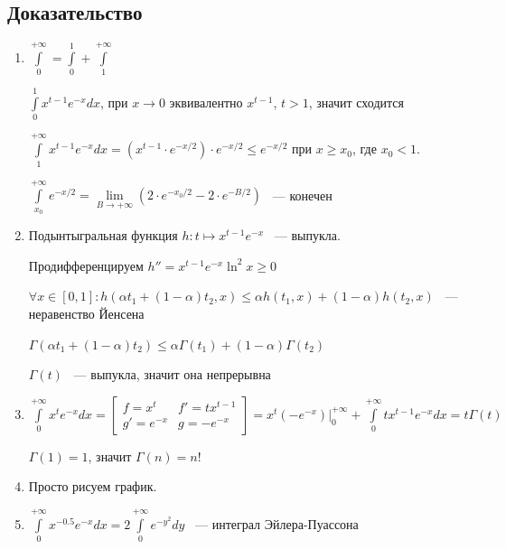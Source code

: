 \documentclass{article}
\begin{document}
        \subsection{Доказательство}
        
            \begin{enumerate}
            
                \item $\int\limits^{+\infty}_0 = \int\limits^1_0 + \int\limits^{+\infty}_1$
                
                    $\int\limits^1_0 x^{t - 1} e^{-x} dx$, при $x \rightarrow 0$ эквивалентно $x^{t - 1}$, $t > 1$, значит сходится
                    
                    $\int\limits^{+\infty}_1 x^{t - 1} e^{-x} dx = \left( x^{t - 1} \cdot e^{-x / 2} \right) \cdot e^{-x / 2} \leq e^{-x / 2}$ при $x \geq x_0$, где $x_0 < 1$.
                
                    $\int\limits^{+\infty}_{x_0} e^{-x / 2} = \lim\limits_{B \rightarrow +\infty} \left(2 \cdot e^{-x_0 / 2} - 2 \cdot e^{-B / 2} \right)$ ~--- конечен
                    
                \item Подынтыгральная функция $h : t \mapsto x^{t - 1} e^{-x}$ ~--- выпукла. 
                
                    Продифференцируем $h'' = x^{t - 1} e^{-x} \ln^2{x} \geq 0$
                
                    $\forall x \in [0, 1] :  h \left(\alpha t_1 + (1 - \alpha) t_2, x \right) \leq \alpha h(t_1, x) + (1 - \alpha) h(t_2, x)$ ~--- неравенство Йенсена
                    
                    $\Gamma(\alpha t_1 + (1 - \alpha) t_2) \leq \alpha \Gamma(t_1) + (1 - \alpha) \Gamma (t_2)$
                    
                    $\Gamma(t)$ ~--- выпукла, значит она непрерывна
                    
                \item $\int\limits^{+\infty}_0 x^t e^{-x} dx = \begin{bmatrix} f = x^t & f' = t x^{t - 1} \\ g' = e^{-x} & g = -e^{-x} \end{bmatrix} = x^t(-e^{-x}) \bigg|^{+\infty}_0 + \int\limits^{+\infty}_0 t x^{t - 1} e^{-x} dx = t \Gamma(t)$
                
                    $\Gamma(1) = 1$, значит $\Gamma(n) = n!$
                    
                \item Просто рисуем график.
                    
                \item $\int\limits^{+\infty}_0 x^{-0.5} e^{-x} dx = 2 \int\limits^{+\infty}_0 e^{-y^2} dy$ ~--- интеграл Эйлера-Пуассона
                
            \end{enumerate}
    
\end{document}
